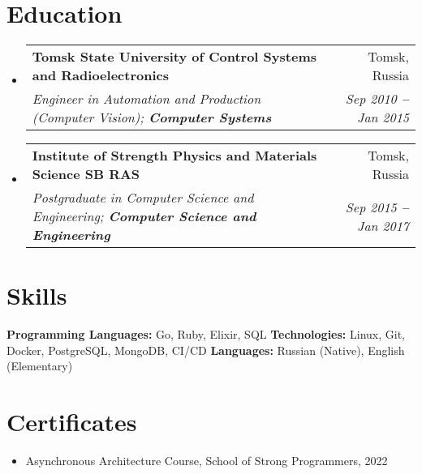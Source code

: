\documentclass[letterpaper,11pt]{article}
\makeatletter
\newcommand{\resumeItem}[1]{
  \item\small{
    {#1 \vspace{-2pt}}
  }
}
\newcommand{\resumeSubheading}[4]{
  \vspace{-2pt}\item
    \begin{tabular*}{0.97\textwidth}[t]{l@{\extracolsep{\fill}}r}
      \textbf{#1} & #2 \\
      \textit{\small#3} & \textit{\small #4} \\
    \end{tabular*}\vspace{-7pt}
}
\newcommand{\resumeSubItem}[1]{\resumeItem{#1}\vspace{-4pt}}
\newcommand{\resumeSubHeadingListStart}{\begin{itemize}[leftmargin=0.15in, label={}]}
\newcommand{\resumeSubHeadingListEnd}{\end{itemize}}
\makeatother
\begin{document}
\section{Education}
  \vspace{3pt}
  \resumeSubHeadingListStart
    \resumeSubheading
      {Tomsk State University of Control Systems and Radioelectronics}{Tomsk, Russia}
      {Engineer in Automation and Production (Computer Vision);   \textbf{Computer Systems}}{Sep 2010 \textbf{--} Jan 2015}
    \resumeSubheading
      {Institute of Strength Physics and Materials Science SB RAS}{Tomsk, Russia}
      {Postgraduate in Computer Science and Engineering;   \textbf{Computer Science and Engineering}}{Sep 2015 \textbf{--} Jan 2017}
  \resumeSubHeadingListEnd
\section{Skills}
\vspace{2pt}
\resumeSubHeadingListStart
\small{\item{
\textbf{Programming Languages:} Go, Ruby, Elixir, SQL \vspace{3pt}
\textbf{Technologies:} Linux, Git, Docker, PostgreSQL, MongoDB, CI/CD \vspace{3pt}
\textbf{Languages:} Russian (Native), English (Elementary)
}}
\resumeSubHeadingListEnd

\section{Certificates}
\vspace{2pt}
\resumeSubHeadingListStart
\resumeSubItem{Asynchronous Architecture Course, School of Strong Programmers, 2022}
\resumeSubHeadingListEnd
\end{document}
